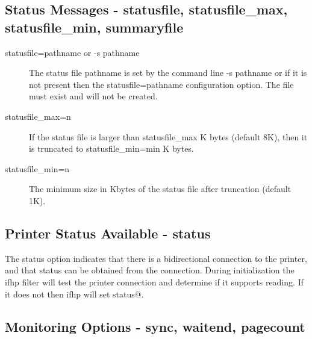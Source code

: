\documentclass[a4paper]{article}
\begin{document}
\subsection{Status Messages - statusfile, statusfile\_max, statusfile\_min, summaryfile
\label{statusfile}
\label{statusfile_max}
\label{statusfile_min}
\label{summaryfile}}

\begin{description}
\item[statusfile=pathname or -s pathname] \mbox{}

The status file pathname is set by the command line
{\ttfamily -s pathname}
or if it is not present then the
{\ttfamily statusfile=pathname}
configuration option.
The file must exist and will not be created.



\item[statusfile\_max=n] \mbox{}

If the status file is larger than
{\ttfamily statusfile\_max} K bytes (default 8K),
then it is truncated to
{\ttfamily statusfile\_min=min}
K bytes.



\item[statusfile\_min=n] \mbox{}

The minimum size in Kbytes of the status file after truncation
(default 1K).

\end{description}



\subsection{Printer Status Available - status
\label{status}}

The {\ttfamily status} option indicates that there is a bidirectional
connection to the printer,
and that status can be obtained from the connection.
During initialization
the {\ttfamily ifhp} filter will test the printer connection and determine if
it supports reading.
If it does not then {\ttfamily ifhp} will set {\ttfamily status@}.


\subsection{Monitoring Options - sync, waitend, pagecount}
\end{document}
